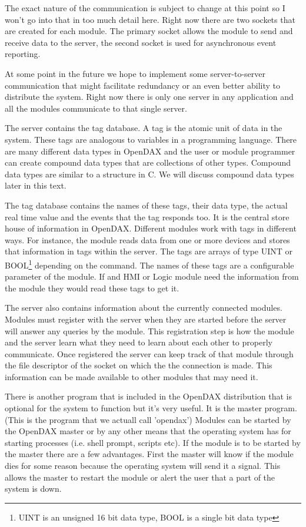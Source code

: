 The exact nature of the communication is subject to change at this point so I won't go into that in too much detail here.  Right now there are two sockets that are created for each module.  The primary socket allows the module to send and receive data to the server, the second socket is used for asynchronous event reporting.

At some point in the future we hope to implement some server-to-server communication that might facilitate redundancy or an even better ability to distribute the system.  Right now there is only one server in any application and all the modules communicate to that single server.

The server contains the tag database.  A tag is the atomic unit of data in the system.  These tags are analogous to variables in a programming language.  There are many different data types in OpenDAX and the user or module programmer can create compound data types that are collections of other types.  Compound data types are similar to a structure in C.  We will discuss compound data types later in this text.

The tag database contains the names of these tags, their data type, the actual real time value and the events that the tag responds too.  It is the central store house of information in OpenDAX.  Different modules work with tags in different ways.  For instance, the \modbus {}module reads data from one or more \modbus devices and stores that information in tags within the server.  The tags are arrays of type UINT or BOOL\footnote{UINT is an unsigned 16 bit data type, BOOL is a single bit data type} depending on the command.  The names of these tags are a configurable parameter of the \modbus module.  If and HMI or Logic module need the information from the \modbus module they would read these tags to get it.

The server also contains information about the currently connected modules.  Modules must register with the server when they are started before the server will answer any queries by the module.  This registration step is how the module and the server learn what they need to learn about each other to properly communicate.  Once registered the server can keep track of that module through the file descriptor of the socket on which the the connection is made.  This information can be made available to other modules that may need it.

There is another program that is included in the OpenDAX distribution that is optional for the system to function but it's very useful.  It is the master program.  (This is the program that we actuall call 'opendax')  Modules can be started by the OpenDAX master or by any other means that the operating system has for starting processes (i.e. shell prompt, scripts etc).  If the module is to be started by the master there are a few advantages.  First the master will know if the module dies for some reason because the operating system will send it a signal.  This allows the master to restart the module or alert the user that a part of the system is down.

